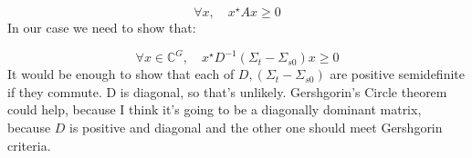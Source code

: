 \documentclass[a4paper,letterpaper,12pt,oneside,draft]{article}
\begin{document}
    \begin{equation}
    \label{eq:positiveSemidefinite}
        \forall x,\quad x^\star Ax\geq 0
    \end{equation}
    In our case we need to show that:
    
    \begin{equation}
    \forall x\in\mathbb{C}^G,\quad x^\star D^{-1}(\Sigma_t-\Sigma_{s0})x\geq 0
    \end{equation}
    It would be enough to show that each of $D,(\Sigma_t-\Sigma_{s0})$ are positive semidefinite if they commute. D is diagonal, so that's unlikely. Gershgorin's Circle theorem could help, because I think it's going to be a diagonally dominant matrix, because $D$ is positive and diagonal and the other one should meet Gershgorin criteria.
\end{document}
